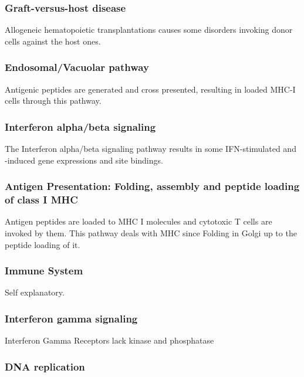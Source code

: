 \documentclass[3p,authoryear,preprint,12pt]{elsarticle}
\begin{document}
\subsubsection{Graft-versus-host disease}
Allogeneic hematopoietic transplantations causes some disorders invoking donor cells against the host ones. %

\subsubsection{Endosomal/Vacuolar pathway}
Antigenic peptides are generated and cross presented, resulting in loaded MHC-I cells through this pathway. %

\subsubsection{Interferon alpha/beta signaling}
The Interferon alpha/beta signaling pathway results in some IFN-stimulated and -induced gene expressions and site bindings.

\subsubsection{Antigen Presentation: Folding, assembly and peptide loading of class I MHC}
Antigen peptides are loaded to MHC I molecules and cytotoxic T cells are invoked by them. This pathway deals with MHC since Folding in Golgi up to the peptide loading of it.

\subsubsection{Immune System}
Self explanatory.

\subsubsection{Interferon gamma signaling}
Interferon Gamma Receptors lack kinase and phosphatase

\subsubsection{DNA replication}
\end{document}
